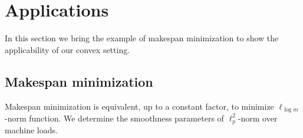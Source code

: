 
\section{Applications} \label{appix-applications}

In this section we bring the example of makespan minimization to show the applicability of our convex setting.

\subsection{Makespan minimization}


Makespan minimization is equivalent, up to a constant factor, to minimize $\ell_{\log m}$-norm function.
We determine the smoothness parameters of $\ell_{p}^{2}$-norm over machine loads.

